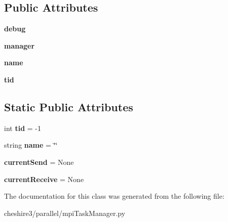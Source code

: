 \subsection*{Public Attributes}
\begin{DoxyCompactItemize}
\item 
\hypertarget{classcheshire3_1_1parallel_1_1mpi_task_manager_1_1_task_afb378dde37abc1a46553186e6334643c}{{\bfseries debug}}\label{classcheshire3_1_1parallel_1_1mpi_task_manager_1_1_task_afb378dde37abc1a46553186e6334643c}

\item 
\hypertarget{classcheshire3_1_1parallel_1_1mpi_task_manager_1_1_task_af6df5b12d20e8d79a6280f2ac3261967}{{\bfseries manager}}\label{classcheshire3_1_1parallel_1_1mpi_task_manager_1_1_task_af6df5b12d20e8d79a6280f2ac3261967}

\item 
\hypertarget{classcheshire3_1_1parallel_1_1mpi_task_manager_1_1_task_aeec06810dc5f6ceacddfdc2f187c9540}{{\bfseries name}}\label{classcheshire3_1_1parallel_1_1mpi_task_manager_1_1_task_aeec06810dc5f6ceacddfdc2f187c9540}

\item 
\hypertarget{classcheshire3_1_1parallel_1_1mpi_task_manager_1_1_task_ae496aae1cce7e973e063b92ac3c0a2ae}{{\bfseries tid}}\label{classcheshire3_1_1parallel_1_1mpi_task_manager_1_1_task_ae496aae1cce7e973e063b92ac3c0a2ae}

\end{DoxyCompactItemize}
\subsection*{Static Public Attributes}
\begin{DoxyCompactItemize}
\item 
\hypertarget{classcheshire3_1_1parallel_1_1mpi_task_manager_1_1_task_a5f43ffe08d1ccd55626d5fce4bab3d37}{int {\bfseries tid} = -\/1}\label{classcheshire3_1_1parallel_1_1mpi_task_manager_1_1_task_a5f43ffe08d1ccd55626d5fce4bab3d37}

\item 
\hypertarget{classcheshire3_1_1parallel_1_1mpi_task_manager_1_1_task_ae6e8863b1a6f392d0dce3edeb7c82347}{string {\bfseries name} = \char`\"{}\char`\"{}}\label{classcheshire3_1_1parallel_1_1mpi_task_manager_1_1_task_ae6e8863b1a6f392d0dce3edeb7c82347}

\item 
\hypertarget{classcheshire3_1_1parallel_1_1mpi_task_manager_1_1_task_ad6bfe53c0d2d08f7a053c1445580d413}{{\bfseries current\-Send} = None}\label{classcheshire3_1_1parallel_1_1mpi_task_manager_1_1_task_ad6bfe53c0d2d08f7a053c1445580d413}

\item 
\hypertarget{classcheshire3_1_1parallel_1_1mpi_task_manager_1_1_task_a17ad04129ef5f1fe53ff255c567ec725}{{\bfseries current\-Receive} = None}\label{classcheshire3_1_1parallel_1_1mpi_task_manager_1_1_task_a17ad04129ef5f1fe53ff255c567ec725}

\end{DoxyCompactItemize}


The documentation for this class was generated from the following file\-:\begin{DoxyCompactItemize}
\item 
cheshire3/parallel/mpi\-Task\-Manager.\-py\end{DoxyCompactItemize}
